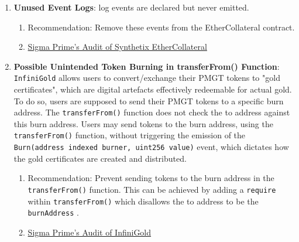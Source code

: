 \begin{enumerate}
\item\textbf{Unused Event Logs}: log events are declared but never emitted.
	\begin{enumerate}
	\item Recommendation: Remove these events from the EtherCollateral contract.
	\item\href{https://github.com/sigp/public-audits/blob/master/synthetix/ethercollateral/review.pdf}{Sigma Prime's Audit of Synthetix EtherCollateral}
	\end{enumerate}

\item\textbf{Possible Unintended Token Burning in transferFrom() Function}: \verb|InfiniGold| allows users to convert/exchange their PMGT tokens to "gold certificates", which are digital artefacts effectively redeemable for actual gold. To do so, users are supposed to send their PMGT tokens to a specific burn address. The \verb|transferFrom()| function does not check the to address against this burn address. Users may send tokens to the burn address, using the \verb|transferFrom()| function, without triggering the emission of the \verb|Burn(address indexed burner, uint256 value)| event, which dictates how the gold certificates are created and distributed.
	\begin{enumerate}
	\item Recommendation: Prevent sending tokens to the burn address in the \verb|transferFrom()| function. This can be achieved by adding a \verb|require| within \verb|transferFrom()| which disallows the to address to be the \verb|burnAddress| .
	\item\href{https://github.com/sigp/public-audits/raw/master/infinigold/review.pdf}{Sigma Prime's Audit of InfiniGold}
	\end{enumerate}


\end{enumerate}
